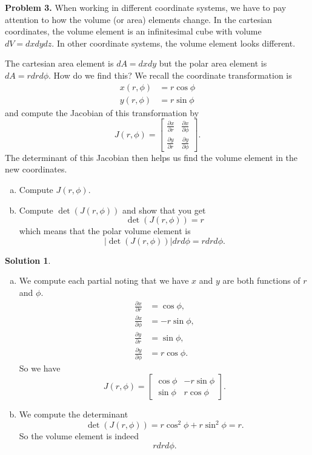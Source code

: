 \documentclass[12pt]{report} %
\theoremstyle{definition}
\newtheorem{solution}{Solution}
\begin{document}
\noindent\textbf{Problem 3.} When working in different coordinate systems, we have to pay attention to how the volume (or area) elements change.  In the cartesian coordinates, the volume element is an infinitesimal cube with volume $dV=dxdydz$.  In other coordinate systems, the volume element looks different.  

The cartesian area element is $dA=dxdy$ but the polar area element is $dA=rdrd\phi$. How do we find this? We recall the coordinate transformation is
    \begin{align*}
        x(r,\phi)&=r\cos \phi\\
        y(r,\phi)&=r\sin \phi
    \end{align*}
    and compute the Jacobian of this transformation by
    \[
    J(r,\phi)=\begin{bmatrix} \frac{\partial x}{\partial r} & \frac{\partial x}{\partial \phi} \\ \frac{\partial y}{\partial r} & \frac{\partial y}{\partial \phi}\end{bmatrix}.
    \]
    The determinant of this Jacobian then helps us find the volume element in the new coordinates.
\begin{enumerate}[(a)]
    \item Compute $J(r,\phi)$.
    \item Compute $\det(J(r,\phi))$ and show that you get 
    \[
    \det(J(r,\phi))=r
    \]
    which means that the polar volume element is
    \[
    |\det(J(r,\phi))|drd\phi = rdrd\phi.
    \]
\end{enumerate}
\begin{solution}~
\begin{enumerate}[(a)]
    \item We compute each partial noting that we have $x$ and $y$ are both functions of $r$ and $\phi$.
    \begin{align*}
        \frac{\partial x}{\partial r}&= \cos \phi,\\
        \frac{\partial x}{\partial \phi} &= -r\sin\phi,\\
        \frac{\partial y}{\partial r}&= \sin \phi,\\
        \frac{\partial y}{\partial \phi} &= r\cos \phi.
    \end{align*}
    So we have
    \[
    J(r,\phi) = \begin{bmatrix} \cos \phi & -r\sin \phi \\ \sin \phi & r\cos \phi \end{bmatrix}.
    \]
    \item We compute the determinant
    \[
    \det(J(r,\phi))= r \cos^2\phi + r\sin^2 \phi = r.
    \]
    So the volume element is indeed
    \[
    rdrd\phi.
    \]
\end{enumerate}
\end{solution}
\vspace*{.5cm}
\end{document}
